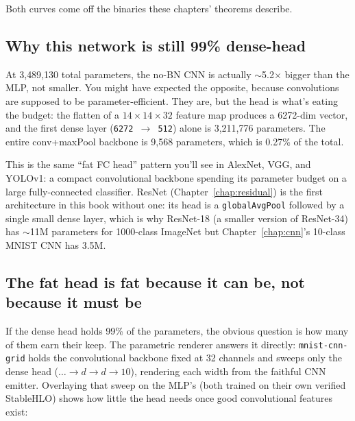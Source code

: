 Both curves come off the binaries these chapters' theorems describe.

\subsection*{Why this network is still 99\% dense-head}

At 3{,}489{,}130 total parameters, the no-BN CNN is actually
$\sim$5.2$\times$ bigger than the MLP, not smaller. You
might have expected the opposite, because convolutions are supposed
to be parameter-efficient. They are, but the head is what's
eating the budget: the flatten of a $14 \times 14 \times 32$ feature
map produces a 6272-dim vector, and the first dense layer
(\texttt{6272 $\to$ 512}) alone is 3{,}211{,}776 parameters. The
entire conv+maxPool backbone is 9{,}568 parameters, which is 0.27\%
of the total.

This is the same ``fat FC head'' pattern you'll see in AlexNet, VGG,
and YOLOv1: a compact convolutional backbone spending its parameter
budget on a large fully-connected classifier. ResNet
(Chapter~\ref{chap:residual}) is the first architecture in this book
without one: its head is a \texttt{globalAvgPool} followed by a single
small dense layer, which is why ResNet-18 (a smaller version of
ResNet-34) has $\sim$11M parameters for 1000-class ImageNet but
Chapter~\ref{chap:cnn}'s 10-class MNIST CNN has 3.5M.



\subsection*{The fat head is fat because it can be, not because it must be}

If the dense head holds 99\% of the parameters, the obvious question is how
many of them earn their keep. The parametric renderer answers it directly:
\texttt{mnist-cnn-grid} holds the convolutional backbone fixed at 32
channels and sweeps only the dense head ($\ldots{\to}d{\to}d{\to}10$),
rendering each width from the faithful CNN emitter. Overlaying that sweep on
the MLP's (both trained on their own verified StableHLO) shows how little
the head needs once good convolutional features exist:

